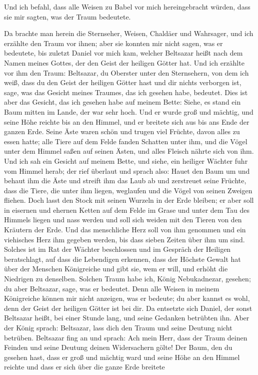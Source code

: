  Und ich befahl, dass alle Weisen zu Babel vor mich
hereingebracht würden, dass sie mir sagten, was der Traum bedeutete.

 Da brachte man herein die Sternseher, Weisen, Chaldäer
und Wahrsager, und ich erzählte den Traum vor ihnen; aber sie konnten
mir nicht sagen, was er bedeutete,  bis zuletzt Daniel vor
mich kam, welcher Beltsazar heißt nach dem Namen meines Gottes, der den
Geist der heiligen Götter hat. Und ich erzählte vor ihm den Traum:
 Beltsazar, du Oberster unter den Sternsehern, von dem ich
weiß, dass du den Geist der heiligen Götter hast und dir nichts
verborgen ist, sage, was das Gesicht meines Traumes, das ich gesehen
habe, bedeutet.  Dies ist aber das Gesicht, das ich
gesehen habe auf meinem Bette: Siehe, es stand ein Baum mitten im Lande,
der war sehr hoch.  Und er wurde groß und mächtig, und
seine Höhe reichte bis an den Himmel, und er breitete sich aus bis ans
Ende der ganzen Erde.  Seine Äste waren schön und trugen
viel Früchte, davon alles zu essen hatte; alle Tiere auf dem Felde
fanden Schatten unter ihm, und die Vögel unter dem Himmel saßen auf
seinen Ästen, und alles Fleisch nährte sich von ihm.  Und
ich sah ein Gesicht auf meinem Bette, und siehe, ein heiliger Wächter
fuhr vom Himmel herab;  der rief überlaut und sprach
also: Hauet den Baum um und behaut ihm die Äste und streift ihm das Laub
ab und zerstreuet seine Früchte, dass die Tiere, die unter ihm liegen,
weglaufen und die Vögel von seinen Zweigen fliehen.  Doch
lasst den Stock mit seinen Wurzeln in der Erde bleiben; er aber soll in
eisernen und ehernen Ketten auf dem Felde im Grase und unter dem Tau des
Himmels liegen und nass werden und soll sich weiden mit den Tieren von
den Kräutern der Erde.  Und das menschliche Herz soll von
ihm genommen und ein viehisches Herz ihm gegeben werden, bis dass sieben
Zeiten über ihm um sind.  Solches ist im Rat der Wächter
beschlossen und im Gespräch der Heiligen beratschlagt, auf dass die
Lebendigen erkennen, dass der Höchste Gewalt hat über der Menschen
Königreiche und gibt sie, wem er will, und erhöht die Niedrigen zu
denselben.  Solchen Traum habe ich, König Nebukadnezar,
gesehen; du aber Beltsazar, sage, was er bedeutet. Denn alle Weisen in
meinem Königreiche können mir nicht anzeigen, was er bedeute; du aber
kannst es wohl, denn der Geist der heiligen Götter ist bei dir.
 Da entsetzte sich Daniel, der sonst Beltsazar heißt, bei
einer Stunde lang, und seine Gedanken betrübten ihn. Aber der König
sprach: Beltsazar, lass dich den Traum und seine Deutung nicht betrüben.
Beltsazar fing an und sprach: Ach mein Herr, dass der Traum deinen
Feinden und seine Deutung deinen Widersachern gölte!  Der
Baum, den du gesehen hast, dass er groß und mächtig ward und seine Höhe
an den Himmel reichte und dass er sich über die ganze Erde breitete

